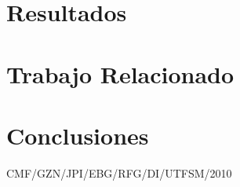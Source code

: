 \documentclass[conference]{IEEEtran}
\begin{document}
\section{Resultados}
\label{sec:resultados}


\section{Trabajo Relacionado}
\label{sec:soa}


\section{Conclusiones}
\label{sec:conclusiones}


%




\vfill \hfill CMF/GZN/JPI/EBG/RFG/DI/UTFSM/2010
\end{document}
